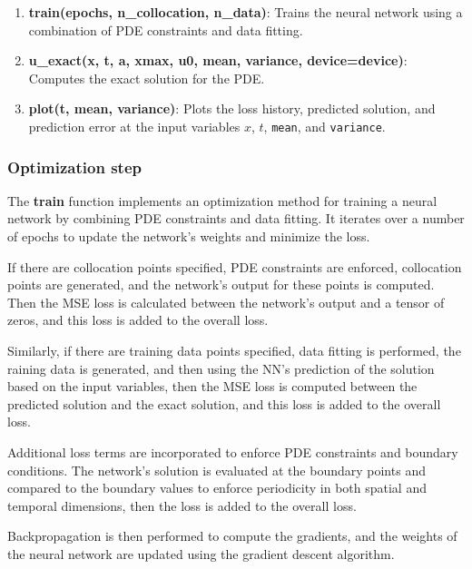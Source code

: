 \documentclass{article}
\begin{document}
\begin{enumerate}
    \item \textbf{train(epochs, n\_collocation, n\_data)}: Trains the neural network using a combination of PDE constraints and data fitting.
    
    \item \textbf{u\_exact(x, t, a, xmax, u0, mean, variance, device=device)}: Computes the exact solution for the PDE.
    
    \item \textbf{plot(t, mean, variance)}: Plots the loss history, predicted solution, and prediction error at the input variables $x$, $t$, \texttt{mean}, and \texttt{variance}.

\end{enumerate}

\subsubsection{Optimization step}

The \textbf{train} function implements an optimization method for training a neural network by combining PDE constraints and data fitting. It iterates over a number of epochs to update the network's weights and minimize the loss.


If there are collocation points specified, PDE constraints are enforced, collocation points are generated, and the network's output for these points is computed. Then the MSE loss is calculated between the network's output and a tensor of zeros, and this loss is added to the overall loss.

Similarly, if there are training data points specified, data fitting is performed, the raining data is generated, and then using the NN's prediction of the solution based on the input variables, then the MSE loss is computed between the predicted solution and the exact solution, and this loss is added to the overall loss.

Additional loss terms are incorporated to enforce PDE constraints and boundary conditions. The network's solution is evaluated at the boundary points and compared to the boundary values to enforce periodicity in both spatial and temporal dimensions, then the loss is added to the overall loss.

Backpropagation is then performed to compute the gradients, and the weights of the neural network are updated using the gradient descent algorithm.
\end{document}
